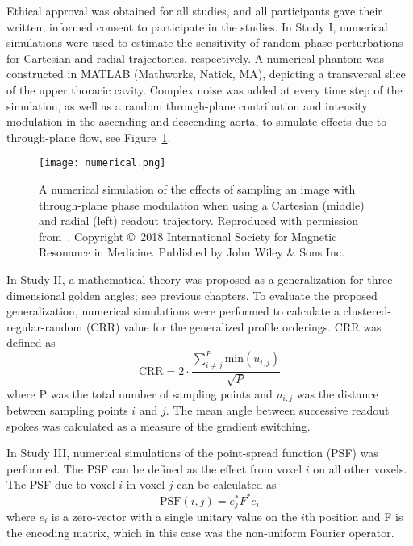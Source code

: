 Ethical approval was obtained for all studies, and all participants gave their written, informed consent to participate in the studies.
In Study I, numerical simulations were used to estimate the sensitivity of random phase perturbations for Cartesian and radial trajectories, respectively. A numerical phantom was constructed in MATLAB (Mathworks, Natick, MA), depicting a transversal slice of the upper thoracic cavity. Complex noise was added at every time step of the simulation, as well as a random through-plane contribution and intensity modulation in the ascending and descending aorta, to simulate effects due to through-plane flow, see Figure~\ref{fig:numerical}.
\begin{figure}
    \centering
    \texttt{[image: numerical.png]}
    \caption{A numerical simulation of the effects of sampling an image with through-plane phase modulation when using a Cartesian (middle) and radial (left) readout trajectory. Reproduced with permission from~\cite{Fyrdahl2018}. Copyright \copyright~2018 International Society for Magnetic Resonance in Medicine. Published by John Wiley \& Sons Inc.}
    \label{fig:numerical}
\end{figure}
In Study II, a mathematical theory was proposed as a generalization for three-dimensional golden angles; see previous chapters. To evaluate the proposed generalization, numerical simulations were performed to calculate a clustered-regular-random (CRR)  value for the generalized profile orderings. CRR was defined as
\begin{equation}
    \textrm{CRR} = 2 \cdot \frac{\sum_{i\ne j}^{P} \textrm{min}(u_{i,j})}{\sqrt{P}}
\end{equation}
where P was the total number of sampling points and $u_{i,j}$ was the distance between sampling points $i$ and $j$. The mean angle between successive readout spokes was calculated as a measure of the gradient switching.

In Study III, numerical simulations of the point-spread function (PSF)  was performed. The PSF can be defined as the effect from voxel $i$ on all other voxels. The PSF due to voxel $i$ in voxel $j$ can be calculated as
\begin{equation}
    \textrm{PSF}(i,j) = e_j^*F^*e_i
    \label{eq:psf}
\end{equation}
where $e_i$ is a zero-vector with a single unitary value on the $i$th position and F is the encoding matrix, which in this case was the non-uniform Fourier operator.

